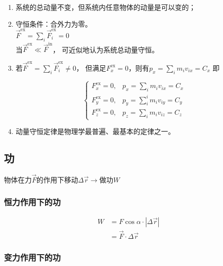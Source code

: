 \documentclass[
	12pt, %
	a4paper, %
]{myLegrandOrangeBook}
\begin{document}
\begin{enumerate}
    \item 系统的总动量不变，但系统内任意物体的动量是可以变的；
    \item 守恒条件：合外力为零。\\
        \(\overrightarrow{F}^{\mathrm{ex}} = \sum_i \overrightarrow{F}_i^{\mathrm{ex}}= 0\)\\
        当\(\overrightarrow{F}^{\mathrm{ex}} \ll \overrightarrow{F}^{\mathrm{in}}\)，
        可近似地认为系统总动量守恒。
    \item 若\(\overrightarrow{F}^{\mathrm{ex}} = \sum_i \overrightarrow{F}_i^{\mathrm{ex}}\neq 0\)，
        但满足\(F_{x}^{\mathrm{ex}} = 0\)，则有$p_x=\sum_i m_i v_{i x}=C_x$
        即

        \begin{equation}
            \begin{cases}F_x^{\mathrm{ex}}=0, & p_x=\sum_i m_i v_{i x}=C_x \\
            F_y^{\mathrm{ex}}=0, & p_y=\sum_i^i m_i v_{i y}=C_y \\
            F_z^{\mathrm{ex}}=0, & p_z=\sum_i m_i v_{i z}=C_z\end{cases}
        \end{equation}
    \item 动量守恒定律是物理学最普遍、最基本的定律之一。
\end{enumerate}

\subsection{功}

物体在力\(\overrightarrow{F}\)的作用下移动\(\Delta \overrightarrow{r} \rightarrow\)做功\(W\)

\subsubsection*{恒力作用下的功}

\begin{equation}
    \begin{aligned}
    W & =F \cos \alpha \cdot|\Delta \overrightarrow{r}| \\
    & =\overrightarrow{F} \cdot \Delta \overrightarrow{r}
    \end{aligned}
\end{equation}

\subsubsection*{变力作用下的功}
\end{document}
